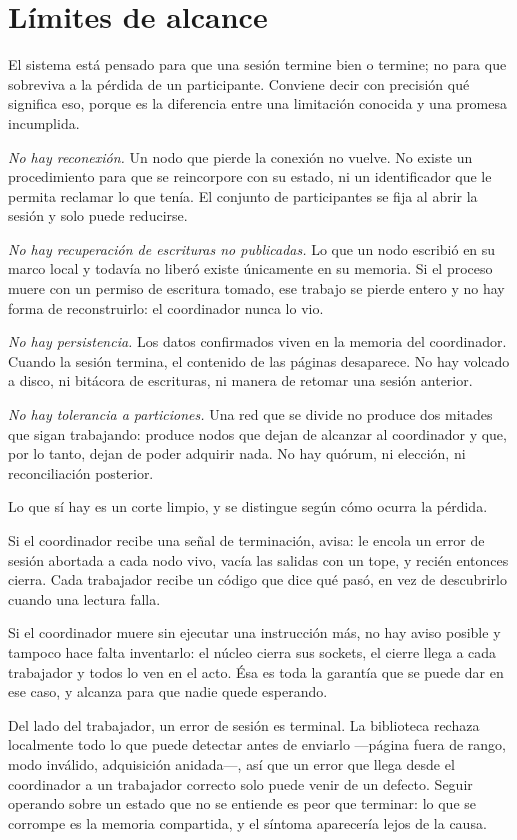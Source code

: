 \section{Límites de alcance}

El sistema está pensado para que una sesión termine bien o termine; no para
que sobreviva a la pérdida de un participante. Conviene decir con precisión
qué significa eso, porque es la diferencia entre una limitación conocida y una
promesa incumplida.

\emph{No hay reconexión.} Un nodo que pierde la conexión no vuelve. No existe
un procedimiento para que se reincorpore con su estado, ni un identificador
que le permita reclamar lo que tenía. El conjunto de participantes se fija al
abrir la sesión y solo puede reducirse.

\emph{No hay recuperación de escrituras no publicadas.} Lo que un nodo escribió
en su marco local y todavía no liberó existe únicamente en su memoria. Si el
proceso muere con un permiso de escritura tomado, ese trabajo se pierde entero
y no hay forma de reconstruirlo: el coordinador nunca lo vio.

\emph{No hay persistencia.} Los datos confirmados viven en la memoria del
coordinador. Cuando la sesión termina, el contenido de las páginas desaparece.
No hay volcado a disco, ni bitácora de escrituras, ni manera de retomar una
sesión anterior.

\emph{No hay tolerancia a particiones.} Una red que se divide no produce dos
mitades que sigan trabajando: produce nodos que dejan de alcanzar al
coordinador y que, por lo tanto, dejan de poder adquirir nada. No hay quórum,
ni elección, ni reconciliación posterior.

Lo que sí hay es un corte limpio, y se distingue según cómo ocurra la pérdida.

Si el coordinador recibe una señal de terminación, avisa: le encola un error
de sesión abortada a cada nodo vivo, vacía las salidas con un tope, y recién
entonces cierra. Cada trabajador recibe un código que dice qué pasó, en vez de
descubrirlo cuando una lectura falla.

Si el coordinador muere sin ejecutar una instrucción más, no hay aviso posible
y tampoco hace falta inventarlo: el núcleo cierra sus sockets, el cierre llega
a cada trabajador y todos lo ven en el acto. Ésa es toda la garantía que se
puede dar en ese caso, y alcanza para que nadie quede esperando.

Del lado del trabajador, un error de sesión es terminal. La biblioteca rechaza
localmente todo lo que puede detectar antes de enviarlo —página fuera de
rango, modo inválido, adquisición anidada—, así que un error que llega desde
el coordinador a un trabajador correcto solo puede venir de un defecto. Seguir
operando sobre un estado que no se entiende es peor que terminar: lo que se
corrompe es la memoria compartida, y el síntoma aparecería lejos de la causa.

